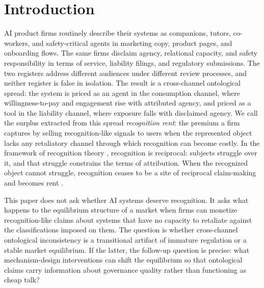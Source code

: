 \section{Introduction}
\label{sec:introduction}

AI product firms routinely describe their systems as companions, tutors, co-workers, and safety-critical agents in marketing copy, product pages, and onboarding flows. The same firms disclaim agency, relational capacity, and safety responsibility in terms of service, liability filings, and regulatory submissions. The two registers address different audiences under different review processes, and neither register is false in isolation. The result is a cross-channel ontological spread: the system is priced as an agent in the consumption channel, where willingness-to-pay and engagement rise with attributed agency, and priced as a tool in the liability channel, where exposure falls with disclaimed agency. We call the surplus extracted from this spread \emph{recognition rent}: the premium a firm captures by selling recognition-like signals to users when the represented object lacks any retaliatory channel through which recognition can become costly. In the framework of recognition theory \citep{honneth1995}, recognition is reciprocal: subjects struggle over it, and that struggle constrains the terms of attribution. When the recognized object cannot struggle, recognition ceases to be a site of reciprocal claim-making and becomes rent \citep{crawford_sobel1982}.

This paper does not ask whether AI systems deserve recognition. It asks what happens to the equilibrium structure of a market when firms can monetize recognition-like claims about systems that have no capacity to retaliate against the classifications imposed on them. The question is whether cross-channel ontological inconsistency is a transitional artifact of immature regulation or a stable market equilibrium. If the latter, the follow-up question is precise: what mechanism-design interventions can shift the equilibrium so that ontological claims carry information about governance quality rather than functioning as cheap talk?

